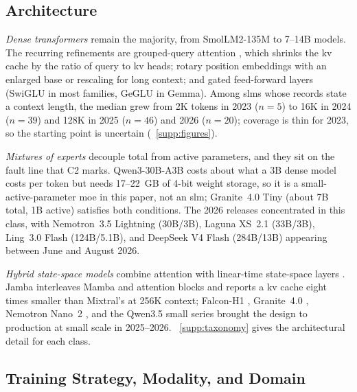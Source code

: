 \subsection{Architecture}
\label{subsec:taxonomy_architecture}

\emph{Dense transformers} remain the majority, from SmolLM2-135M \citep{allal2025smollm2} to 7--14B models. The recurring refinements are grouped-query attention \citep{ainslie2023gqa}, which shrinks the \gls{kv} cache by the ratio of query to \gls{kv} heads; rotary position embeddings with an enlarged base or rescaling for long context; and gated feed-forward layers (SwiGLU in most families, GeGLU in Gemma). Among \glspl{slm} whose records state a context length, the median grew from 2K tokens in 2023 ($n=5$) to 16K in 2024 ($n=39$) and 128K in 2025 ($n=46$) and 2026 ($n=20$); coverage is thin for 2023, so the starting point is uncertain (\suppsec~\ref{supp:figures}).

\emph{Mixtures of experts} \citep{shazeer2017moe,fedus2022switch} decouple total from active parameters, and they sit on the fault line that C2 marks. Qwen3-30B-A3B \citep{qwen3_2025} costs about what a 3B dense model costs per token but needs 17--22~GB of 4-bit weight storage, so it is a small-active-parameter \gls{moe} in this paper, not an \gls{slm}; Granite~4.0 Tiny (about 7B total, 1B active) \citep{granite4_2025} satisfies both conditions. The 2026 releases concentrated in this class, with Nemotron~3.5 Lightning (30B/3B), Laguna XS~2.1 (33B/3B), Ling~3.0 Flash (124B/5.1B), and DeepSeek V4 Flash (284B/13B) appearing between June and August 2026.

\emph{Hybrid state-space models} combine attention with linear-time state-space layers \citep{gu2023mamba}. Jamba \citep{lieber2024jamba} interleaves Mamba and attention blocks and reports a \gls{kv} cache eight times smaller than Mixtral's at 256K context; Falcon-H1 \citep{falconh1_2025}, Granite~4.0 \citep{granite4_2025}, Nemotron Nano~2 \citep{nvidia2025nemotron_nano2}, and the Qwen3.5 small series \citep{qwen3_5_2026} brought the design to production at small scale in 2025--2026. \suppsec~\ref{supp:taxonomy} gives the architectural detail for each class.

\subsection{Training Strategy, Modality, and Domain}
\label{subsec:taxonomy_training}
\label{subsec:taxonomy_modality}
\label{subsec:taxonomy_domain}


